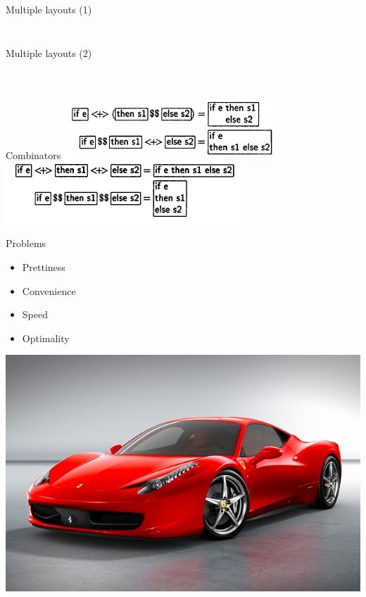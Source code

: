 \documentclass{beamer}
\begin{document}
\begin{frame}[fragile]{Multiple layouts (1)}
	\begin{block}{}
		\inputminted{pascal}{code/for1.pas}
	\end{block}
	\begin{block}{}
		\inputminted{pascal}{code/for2.pas}
	\end{block}
\end{frame}

\begin{frame}[fragile]{Multiple layouts (2)}
	\begin{block}{}
		\inputminted{pascal}{code/if1.pas}
	\end{block}
	\begin{block}{}
		\inputminted{pascal}{code/if2.pas}
	\end{block}
	\begin{block}{}
		\inputminted{pascal}{code/if3.pas}
	\end{block}
\end{frame}

\begin{frame}{Combinators}
	\includegraphics[width = 1\linewidth]{images/a1.png}
	\includegraphics[width = 1\linewidth]{images/a2.png}	
\end{frame}

\begin{frame}{Problems}
	\begin{itemize}
		\item Prettiness
		\item Convenience
		\item Speed
		\vfill
		\item Optimality
	\end{itemize}
	\hfill
	\includegraphics[width = 0.6\linewidth]{images/ferrari.jpg}
\end{frame}
\end{document}
